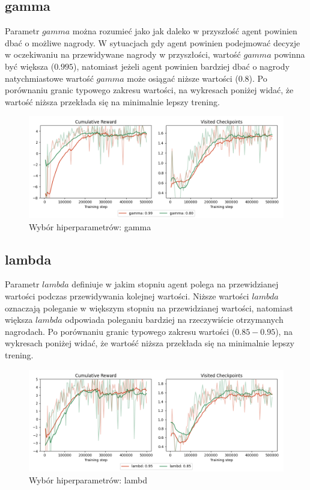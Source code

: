 \subsection{gamma}
Parametr $gamma$ można rozumieć jako jak daleko w przyszłość agent powinien dbać o możliwe nagrody. W sytuacjach gdy agent powinien podejmować decyzje w oczekiwaniu na przewidywane nagrody w przyszłości, wartość $gamma$ powinna być większa ($0.995$), natomiast jeżeli agent powinien bardziej dbać o nagrody natychmiastowe wartość $gamma$ może osiągać niższe wartości ($0.8$). Po porównaniu granic typowego zakresu wartości, na wykresach poniżej widać, że wartość niższa przekłada się na minimalnie lepszy trening.
\begin{figure}[H]
    \centering
    \includegraphics[width=\textwidth]{graphs/hyperparameters_gamma.png}
    \caption{Wybór hiperparametrów: gamma}
    \label{fig}
\end{figure}

\subsection{lambda}
Parametr $lambda$ definiuje w jakim stopniu agent polega na przewidzianej wartości podczas przewidywania kolejnej wartości. Niższe wartości $lambda$ oznaczają poleganie w większym stopniu na przewidzianej wartości, natomiast większa $lambda$ odpowiada poleganiu bardziej na rzeczywiście otrzymanych nagrodach. Po porównaniu granic typowego zakresu wartości ($0.85-0.95$), na wykresach poniżej widać, że wartość niższa przekłada się na minimalnie lepszy trening.
\begin{figure}[H]
    \centering
    \includegraphics[width=\textwidth]{graphs/hyperparameters_lambd.png}
    \caption{Wybór hiperparametrów: lambd}
    \label{fig}
\end{figure}

